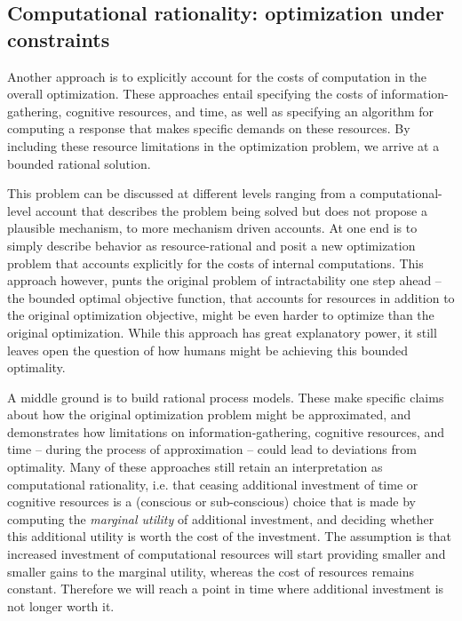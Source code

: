 \subsection{Computational rationality: optimization under constraints}

Another approach is to explicitly account for the costs of computation in the overall optimization. 
These approaches entail specifying the costs of information-gathering, cognitive resources, and time, as well as specifying an algorithm for computing a response that makes specific demands on these resources. By including these resource limitations in the optimization problem, we arrive at a bounded rational solution.

This problem can be discussed at different levels ranging from a computational-level account that describes the problem being solved but does not propose a plausible mechanism, to more mechanism driven accounts. At one end is to simply describe behavior as resource-rational \citep{Vul2014,griffiths2015, schulz2016simple} and posit a new optimization problem that accounts explicitly for the costs of internal computations. This approach however, punts the original problem of intractability one step ahead -- the bounded optimal objective function, that accounts for resources in addition to the original optimization objective, might be even harder to optimize than the original optimization. While this approach has great explanatory power, it still leaves open the question of how humans might be achieving this bounded optimality.

A middle ground is to build rational process models. These make specific claims about how the original optimization problem might be approximated, and demonstrates how limitations on information-gathering, cognitive resources, and time -- during the process of approximation -- could lead to deviations from optimality. Many of these approaches still retain an interpretation as computational rationality, i.e. that ceasing additional investment of time or cognitive resources is a (conscious or sub-conscious) choice that is made by computing the \textit{marginal utility} of additional investment, and deciding whether this additional utility is worth the cost of the investment\cite{gershman15}. The assumption is that increased investment of computational resources will start providing smaller and smaller gains to the marginal utility, whereas the cost of resources remains constant. Therefore we will reach a point in time where additional investment is not longer worth it.

